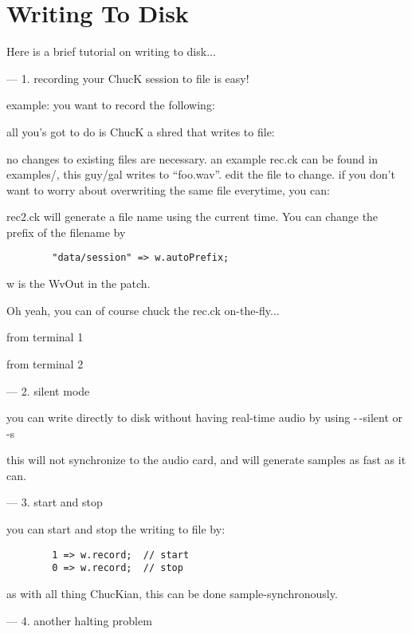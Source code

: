 \section{Writing To Disk}

Here is a brief tutorial on writing to disk...

---
1. recording your ChucK session to file is easy!

example:  you want to record the following:


all you's got to do is ChucK a shred that writes to file:


no changes to existing files are necessary.
an example rec.ck can be found in examples/, this
guy/gal writes to ``foo.wav''.  edit the file to change.
if you don't want to worry about overwriting the same
file everytime, you can:


rec2.ck will generate a file name using the current
time.  You can change the prefix of the filename by
\begin{verbatim}
        "data/session" => w.autoPrefix;
\end{verbatim}
w is the WvOut in the patch.

Oh yeah, you can of course chuck the rec.ck on-the-fly...

from terminal 1

from terminal 2


---
2. silent mode

you can write directly to disk without having real-time audio
by using -\,-silent or -s


this will not synchronize to the audio card, and will generate
samples as fast as it can.


---
3. start and stop

you can start and stop the writing to file by:
\begin{verbatim}
        1 => w.record;  // start
        0 => w.record;  // stop
\end{verbatim}
as with all thing ChucKian, this can be done
sample-synchronously.


---
4. another halting problem


